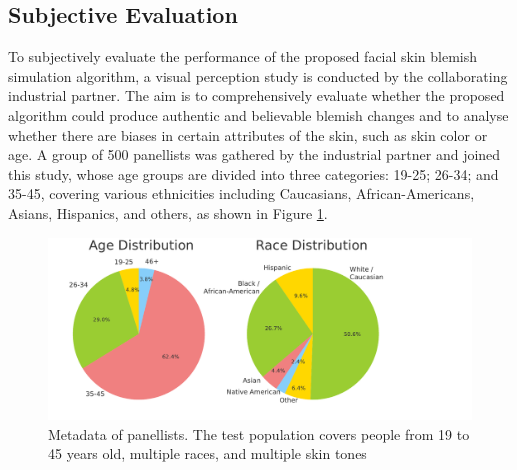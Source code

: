 \begin{spacing}{1.5}
\subsection{Subjective Evaluation}
To subjectively evaluate the performance of the proposed facial skin blemish simulation algorithm, a visual perception study is conducted by the collaborating industrial partner. The aim is to comprehensively evaluate whether the proposed algorithm could produce authentic and believable blemish changes and to analyse whether there are biases in certain attributes of the skin, such as skin color or age. A group of 500 panellists was gathered by the industrial partner and joined this study, whose age groups are divided into three categories: 19-25; 26-34; and 35-45, covering various ethnicities including Caucasians, African-Americans, Asians, Hispanics, and others, as shown in Figure \ref{fig:metadata}.
\begin{figure}[t!]
    \includegraphics[width=0.95\columnwidth]{Chapter4/metadata.pdf}
    \caption{Metadata of panellists. The test population covers people from 19 to 45 years old, multiple races, and multiple skin tones}
    \label{fig:metadata}
\end{figure} 
\begin{figure}[t!]
    \centering

\end{figure}
\end{spacing}
